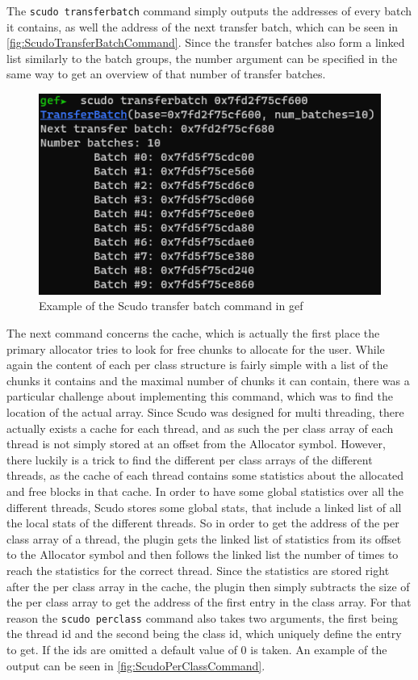 \documentclass[a4paper,11pt,oneside]{report}
\begin{document}
The \verb|scudo transferbatch| command simply outputs the addresses of every batch
it contains, as well the address of the next transfer batch, which can be seen
in \autoref{fig:ScudoTransferBatchCommand}. Since the transfer batches also
form a linked list similarly to the batch groups, the number argument can be
specified in the same way to get an overview of that number of transfer batches.

\begin{figure}[h!]
  \centering
  \includegraphics{figures/ScudoTransferBatchCommand.png}
  \caption{Example of the Scudo transfer batch command in gef}
  \label{fig:ScudoTransferBatchCommand}
\end{figure}

The next command concerns the cache, which is actually the first place the
primary allocator tries to look for free chunks to allocate for the user.
While again the content of each per class structure is fairly simple with a
list of the chunks it contains and the maximal number of chunks it can contain,
there was a particular challenge about implementing this command, which was to
find the location of the actual array. Since Scudo was designed for multi
threading, there actually exists a cache for each thread, and as such the per
class array of each thread is not simply stored at an offset from the Allocator
symbol. However, there luckily is a trick to find the different per class arrays
of the different threads, as the cache of each thread contains some statistics
about the allocated and free blocks in that cache. In order to have some global
statistics over all the different threads, Scudo stores some global stats, that
include a linked list of all the local stats of the different threads. So in
order to get the address of the per class array of a thread, the plugin gets
the linked list of statistics from its offset to the Allocator symbol and then
follows the linked list the number of times to reach the statistics for the
correct thread. Since the statistics are stored right after the per class array
in the cache, the plugin then simply subtracts the size of the per class array
to get the address of the first entry in the class array.
For that reason the \verb|scudo perclass| command also takes two arguments, the first
being the thread id and the second being the class id, which uniquely define
the entry to get. If the ids are omitted a default value of 0 is taken. An
example of the output can be seen in \autoref{fig:ScudoPerClassCommand}.
\end{document}
